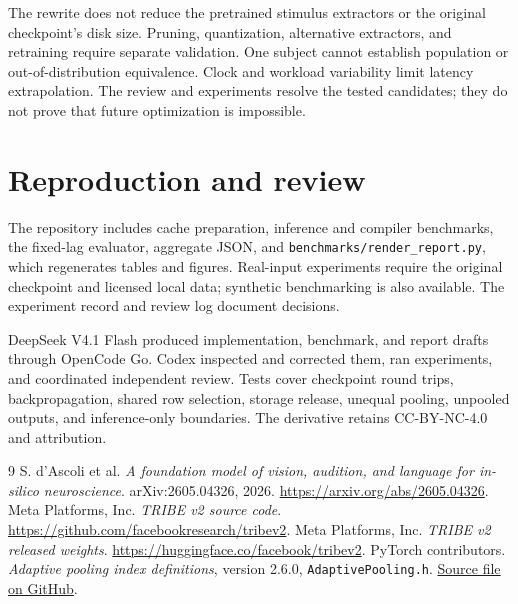 \documentclass[10pt]{article}
\begin{document}
The rewrite does not reduce the pretrained stimulus extractors or the original
checkpoint's disk size. Pruning, quantization, alternative extractors, and
retraining require separate validation. One subject cannot establish population
or out-of-distribution equivalence. Clock and workload variability limit latency
extrapolation. The review and experiments resolve the tested candidates; they
do not prove that future optimization is impossible.

\section{Reproduction and review}
The repository includes cache preparation, inference and compiler benchmarks,
the fixed-lag evaluator, aggregate JSON, and \texttt{benchmarks/render\_report.py},
which regenerates tables and figures. Real-input experiments require the original
checkpoint and licensed local data; synthetic benchmarking is also available.
The experiment record and review log document decisions.

DeepSeek V4.1 Flash produced implementation, benchmark, and report drafts through
OpenCode Go. Codex inspected and corrected them, ran experiments, and coordinated
independent review. Tests cover checkpoint round trips, backpropagation, shared
row selection, storage release, unequal pooling, unpooled outputs, and
inference-only boundaries. The derivative retains CC-BY-NC-4.0 and attribution.

\begin{thebibliography}{9}
 S. d'Ascoli et al. \emph{A foundation model of vision, audition,
and language for in-silico neuroscience}. arXiv:2605.04326, 2026.
\url{https://arxiv.org/abs/2605.04326}.
 Meta Platforms, Inc. \emph{TRIBE v2 source code}.
\url{https://github.com/facebookresearch/tribev2}.
 Meta Platforms, Inc. \emph{TRIBE v2 released weights}.
\url{https://huggingface.co/facebook/tribev2}.
 PyTorch contributors. \emph{Adaptive pooling index definitions},
version 2.6.0, \texttt{AdaptivePooling.h}.
\href{https://github.com/pytorch/pytorch/blob/v2.6.0/aten/src/ATen/native/AdaptivePooling.h}{Source file on GitHub}.
\end{thebibliography}
\end{document}
